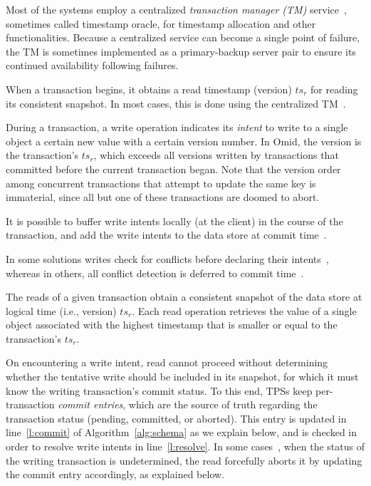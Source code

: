 {Most of the systems employ a centralized \emph{transaction manager (TM)\/} service~\cite{Percolator2010,OmidICDE2014,Omid2017,tephra},
 sometimes called timestamp oracle, for timestamp allocation and other functionalities. 
 Because a centralized service can become a single point of failure, the TM is sometimes implemented
 as a primary-backup server pair to ensure its continued availability following failures.

  When a transaction begins, it obtains a read timestamp (version) $ts_r$ for reading its consistent snapshot.
 In most cases, this is done using the centralized TM~\cite{Percolator2010,OmidICDE2014,Omid2017,tephra}. 

 During a transaction, a write operation indicates its \emph{intent} to write to a single object a certain new value with a certain version number.
In Omid, the version is the transaction's $ts_r$, which exceeds all versions written by transactions that committed before the
current transaction began. Note that the version order among concurrent transactions that  attempt to update the same key is immaterial, 
since all but one of these transactions are doomed to abort. 

It is possible to buffer write intents locally (at the client) in the course of the transaction, and add the write intents to the data store at commit time~\cite{Percolator2010}.

In some solutions writes check for conflicts before declaring their intents~\cite{cockroach}, whereas in others, 
all conflict detection is deferred to commit time~\cite{Percolator2010,OmidICDE2014,Omid2017,tephra}. 

The reads of a given transaction obtain a consistent snapshot of the data store at logical time (i.e., version) $ts_r$.
Each read operation retrieves the value of a single object associated with the highest timestamp that is 
smaller or equal to the transaction's $ts_r$. 

On encountering a write intent, read cannot proceed without determining whether the tentative write should be included in its snapshot,
for which it must know the writing transaction's commit status. 
To this end, TPSs keep per-transaction \emph{commit entries}, which are the source of truth regarding the transaction status 
(pending, committed, or aborted). 
This entry is updated in line~\ref{l:commit} of Algorithm~\ref{alg:schema} as we explain below, 
and is checked in order to resolve write intents in line~\ref{l:resolve}.
In some cases~\cite{Percolator2010,cockroach}, when the status of the writing transaction  is undetermined, the read forcefully aborts
it by updating the commit entry accordingly, as explained below.

}
